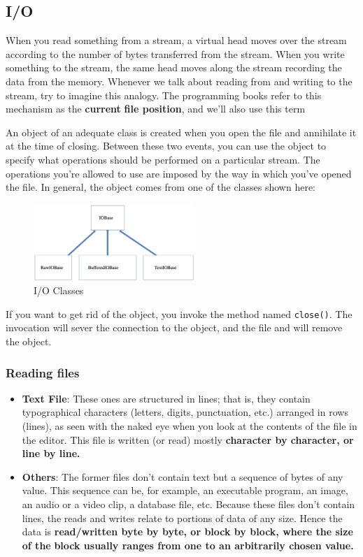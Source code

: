 \documentclass[11pt]{article}
\begin{document}
\newpage

\subsection{I/O}
\label{sec:orgd39d773}
When you read something from a stream, a virtual head moves over the
stream according to the number of bytes transferred from the stream.
When you write something to the stream, the same head moves along the
stream recording the data from the memory.  Whenever we talk about
reading from and writing to the stream, try to imagine this
analogy. The programming books refer to this mechanism as the \textbf{current}
\textbf{file position}, and we’ll also use this term

An object of an adequate class is created when you open the file and
annihilate it at the time of closing.  Between these two events, you
can use the object to specify what operations should be performed on a
particular stream. The operations you’re allowed to use are imposed by
the way in which you’ve opened the file.  In general, the object comes
from one of the classes shown here: 

\begin{figure}[htbp]
\centering
\includegraphics[width=230px]{./images/IO.png}
\caption{I/O Classes}
\end{figure}

If you want to get rid of the object, you invoke the method named
\texttt{close()}. The invocation will sever the connection to the object, and
the file and will remove the object.

\newpage

\subsubsection{Reading files}
\label{sec:org4c13e26}
\begin{itemize}
\item \textbf{Text File}: These ones are structured in lines; that is, they contain
typographical characters (letters, digits, punctuation, etc.)
arranged in rows (lines), as seen with the naked eye when you look
at the contents of the file in the editor.  This file is written (or
read) mostly \textbf{character by character, or line by line.}
\item \textbf{Others}: The former files don’t contain text but a sequence of
bytes of any value. This sequence can be, for example, an executable
program, an image, an audio or a video clip, a database file,
etc. Because these files don’t contain lines, the reads and writes
relate to portions of data of any size. Hence the data is
\textbf{read/written byte by byte, or block by block, where the size of the}
\textbf{block usually ranges from one to an arbitrarily chosen value.}
\end{itemize}
\end{document}
